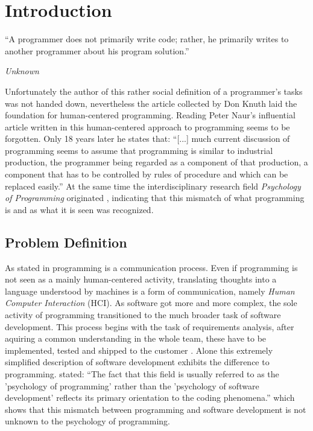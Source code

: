 \chapter{Introduction}
\epigraph{``A programmer does not primarily write code; rather, he primarily writes to another programmer about his program solution.''}{\textit{Unknown}}
\noindent
Unfortunately the author of this rather social definition of a programmer's tasks was not handed down, nevertheless the article \textcite{anonymous_what_1967} collected by Don Knuth laid the foundation for human-centered programming.
Reading Peter Naur's influential article  written in \citeyear{naur_programming_1985} this human-centered approach to programming seems to be forgotten. Only 18 years later he states that: ``[...] much current discussion of programming seems to assume that programming is similar to industrial production, the programmer being regarded as a component of that production, a component that has to be controlled by rules of procedure and which can be replaced easily.''
At the same time the interdisciplinary research field \emph{Psychology of Programming} originated \autocite{myers_past_2009}, indicating that this mismatch of what programming is and as what it is seen was recognized.


\section{Problem Definition}
\label{sec:problem-definition}
As stated in \textcite{anonymous_what_1967} programming is a communication process.
Even if programming is not seen as a mainly human-centered activity, translating thoughts into a language understood by machines is a form of communication, namely \emph{Human Computer Interaction} (HCI).
As software got more and more complex, the sole activity of programming transitioned to the much broader task of software development.
This process begins with the task of requirements analysis, after aquiring a common understanding in the whole team, these have to be implemented, tested and shipped to the customer \autocite{mayr_projekt_2005}.
Alone this extremely simplified description of software development exhibits the difference to programming.
\citeauthor{curtis_psychology_1990} stated: ``The fact that this field is usually referred to as the 'psychology of programming' rather than the 'psychology of software development' reflects its primary orientation to the coding phenomena.'' \autocite[267]{curtis_psychology_1990} which shows that this mismatch between programming and software development is not unknown to the psychology of programming.

